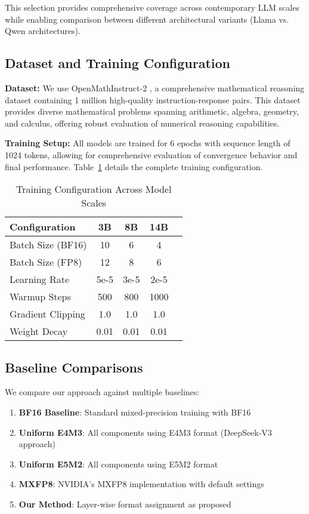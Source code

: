 \documentclass[conference]{IEEEtran}
\begin{document}
This selection provides comprehensive coverage across contemporary LLM scales while enabling comparison between different architectural variants (Llama vs. Qwen architectures).

\subsection{Dataset and Training Configuration}

\textbf{Dataset:} We use OpenMathInstruct-2 \cite{toshniwal2024openmath2}, a comprehensive mathematical reasoning dataset containing 1 million high-quality instruction-response pairs. This dataset provides diverse mathematical problems spanning arithmetic, algebra, geometry, and calculus, offering robust evaluation of numerical reasoning capabilities.

\textbf{Training Setup:} All models are trained for 6 epochs with sequence length of 1024 tokens, allowing for comprehensive evaluation of convergence behavior and final performance. Table~\ref{tab:training_config} details the complete training configuration.

\begin{table}[htbp]
\centering
\caption{Training Configuration Across Model Scales}
\begin{tabular}{@{}lcccc@{}}
\toprule
\textbf{Configuration} & \textbf{3B} & \textbf{8B} & \textbf{14B} \\
\midrule
Batch Size (BF16) & 10 & 6 & 4 \\
Batch Size (FP8) & 12 & 8 & 6 \\
Learning Rate & 5e-5 & 3e-5 & 2e-5 \\
Warmup Steps & 500 & 800 & 1000 \\
Gradient Clipping & 1.0 & 1.0 & 1.0 \\
Weight Decay & 0.01 & 0.01 & 0.01 \\
\bottomrule
\end{tabular}
\label{tab:training_config}
\end{table}

\subsection{Baseline Comparisons}

We compare our approach against multiple baselines:

\begin{enumerate}
\item \textbf{BF16 Baseline}: Standard mixed-precision training with BF16
\item \textbf{Uniform E4M3}: All components using E4M3 format (DeepSeek-V3 approach)
\item \textbf{Uniform E5M2}: All components using E5M2 format
\item \textbf{MXFP8}: NVIDIA's MXFP8 implementation with default settings
\item \textbf{Our Method}: Layer-wise format assignment as proposed
\end{enumerate}
\end{document}
